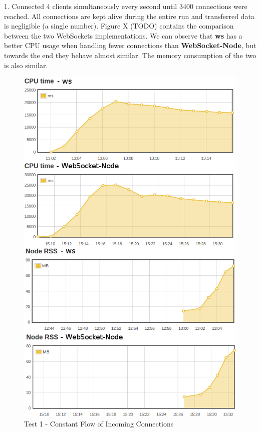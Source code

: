 \documentclass[conference]{IEEEtran}
\begin{document}
1. Connected 4 clients simultaneously every second until 3400 connections were reached.
All connections are kept alive during the entire run and transferred data is negligible
(a single number). Figure X (TODO) contains the comparison between the two WebSockets
implementations. We can observe that \textbf{ws} has a better CPU usage when handling
fewer connections than \textbf{WebSocket-Node}, but towards the end they behave almost
similar. The memory consumption of the two is also similar.
\\
\begin{frame}{}
  \begin{figure}
    \centering
	\includegraphics[width=1\linewidth]{img/test1v2.png}
    \caption{Test 1 - Constant Flow of Incoming Connections}
  \end{figure}
\end{frame}
\end{document}
